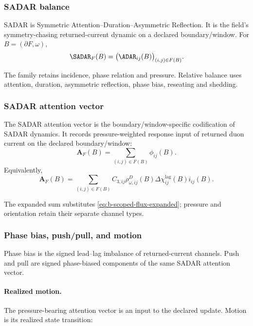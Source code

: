 \subsubsection{SADAR balance}\label{subsec:sadar-balance}
\begin{definition}[SADAR]
SADAR is Symmetric Attention--Duration--Asymmetric Reflection. It is the field's symmetry-chasing returned-current dynamic on a declared boundary/window. For \(B=(\partial F,\omega)\),
\begin{equation}
\SADAR_F(B)=
\big(\ADAR_{ij}(B)\big)_{(i,j)\in F(B)}.
\label{eq:sadar-field}
\end{equation}
\end{definition}
The family retains incidence, phase relation and pressure. Relative balance
uses attention, duration, asymmetric reflection, phase bias, reseating and shedding.

\subsubsection{SADAR attention vector}\label{subsec:sadar-attention-vector}
\begin{definition}
The SADAR attention vector is the boundary/window-specific codification of SADAR dynamics. It records pressure-weighted response input of returned duon current on the declared boundary/window:
\begin{equation}
\mathbf A_F(B)=
\sum_{(i,j)\in F(B)}
\phi_{ij}(B).
\label{eq:sadar-attention-vector}
\end{equation}
Equivalently,
\begin{equation}
\mathbf A_F(B)=
\sum_{(i,j)\in F(B)}
C_{3,ij}\rho^D_{\omega,ij}(B)
\Delta\chi^{\mathrm{lag}}_{ij}(B)i_{ij}(B).
\label{eq:sadar-attention-vector-expanded}
\end{equation}
\end{definition}
The expanded sum substitutes \eqref{eq:b-scoped-flux-expanded}; pressure and
orientation retain their separate channel types.

\subsubsection{Phase bias, push/pull, and motion}\label{subsec:phase-bias-motion}
Phase bias is the signed lead--lag imbalance of returned-current channels. Push and pull are signed phase-biased components of the same SADAR attention vector.
\paragraph{Realized motion.}
The pressure-bearing attention vector is an input to the declared update.
Motion is its realized state transition:


